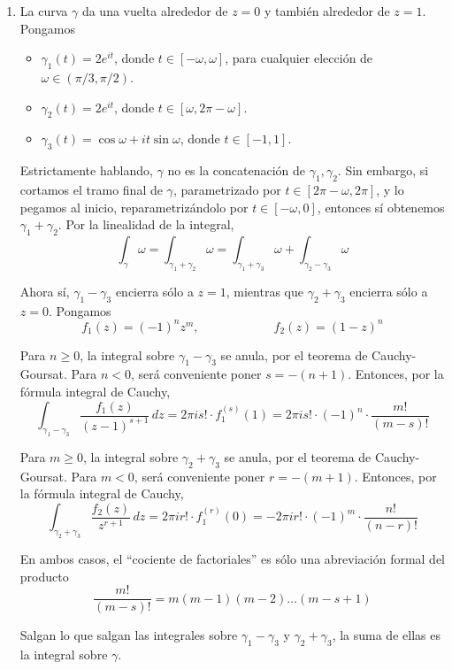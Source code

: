 \begin{solution}
\begin{enumerate}[label=(\alph*)]
    \item La curva $\gamma$ da una vuelta alrededor de $z = 0$ y también alrededor de $z = 1$. Pongamos
    \begin{itemize}
        \item $\gamma_1(t) = 2e^{it}$, donde $t \in [-\omega, \omega]$, para cualquier elección de $\omega \in (\pi/3, \pi/2)$.
        \item $\gamma_2(t) = 2e^{it}$, donde $t \in [\omega, 2\pi - \omega]$.
        \item $\gamma_3(t) = \cos \omega + it \sin \omega$, donde $t \in [-1, 1]$.
    \end{itemize}
    
    Estrictamente hablando, $\gamma$ no es la concatenación de $\gamma_1, \gamma_2$. Sin embargo, si cortamos el tramo final de $\gamma$, parametrizado por $t \in [2\pi - \omega, 2\pi]$, y lo pegamos al inicio, reparametrizándolo por $t \in [-\omega, 0]$, entonces sí obtenemos $\gamma_1 + \gamma_2$. Por la linealidad de la integral,
    $$
    \int_\gamma \omega
        = \int_{\gamma_1 + \gamma_2} \omega
        = \int_{\gamma_1 + \gamma_3} \omega + \int_{\gamma_2 - \gamma_3} \omega
    $$
    
    Ahora sí, $\gamma_1 - \gamma_3$ encierra sólo a $z = 1$, mientras que $\gamma_2 + \gamma_3$ encierra sólo a $z = 0$. Pongamos
    $$f_1(z) = (-1)^n z^m, \qquad \qquad \qquad f_2(z) = (1-z)^n$$
    
    Para $n \ge 0$, la integral sobre $\gamma_1 - \gamma_3$ se anula, por el teorema de Cauchy-Goursat. Para $n < 0$, será conveniente poner $s = -(n+1)$. Entonces, por la fórmula integral de Cauchy,
    $$
    \int_{\gamma_1 - \gamma_3} \frac {f_1(z)} {(z - 1)^{s+1}} \, dz
        = 2\pi is! \cdot f_1^{(s)}(1)
        = 2\pi is! \cdot (-1)^n \cdot \frac {m!} {(m-s)!}
    $$
    
    Para $m \ge 0$, la integral sobre $\gamma_2 + \gamma_3$ se anula, por el teorema de Cauchy-Goursat. Para $m < 0$, será conveniente poner $r = -(m+1)$. Entonces, por la fórmula integral de Cauchy,
    $$
    \int_{\gamma_2 + \gamma_3} \frac {f_2(z)} {z^{r+1}} \, dz
        = 2\pi ir! \cdot f_1^{(r)}(0)
        = -2\pi ir! \cdot (-1)^m \cdot \frac {n!} {(n-r)!}
    $$
    
    En ambos casos, el ``cociente de factoriales'' es sólo una abreviación formal del producto
    $$\frac {m!} {(m-s)!} = m (m-1) (m-2) \dots (m-s+1)$$
    
    Salgan lo que salgan las integrales sobre $\gamma_1 - \gamma_3$ y $\gamma_2 + \gamma_3$, la suma de ellas es la integral sobre $\gamma$.
    

\end{enumerate}
\end{solution}
